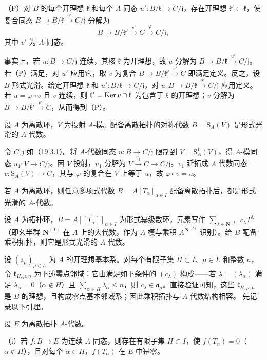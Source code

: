 \noindent（P）对 $B$ 的每个开理想 $\mathfrak k$ 和每个 $A$-同态 $u':B/\mathfrak k\to C/\mathfrak j$，存在开理想 $\mathfrak k'\subset\mathfrak k$，使复合同态 $B\to B/\mathfrak k\xrightarrow{u'}C/\mathfrak j$ 分解为
\[
 B\to B/\mathfrak k'\xrightarrow{v'}C\xrightarrow{\varphi}C/\mathfrak j,
\]
其中 $v'$ 为 $A$-同态。

事实上，若 $u:B\to C/\mathfrak j$ 连续，其核 $\mathfrak k$ 为开理想，故 $u$ 分解为 $B\to B/\mathfrak k\xrightarrow{u'}C/\mathfrak j$。若（P）满足，对 $u'$ 应用它，取 $v$ 为复合 $B\to B/\mathfrak k'\xrightarrow{v'}C$ 即满足定义。反之，设 $B$ 形式光滑。给定开理想 $\mathfrak k$ 和 $u':B/\mathfrak k\to C/\mathfrak j$，对 $u:B\to B/\mathfrak k\xrightarrow{u'}C/\mathfrak j$ 应用定义。若 $u=\varphi\circ v$ 且 $v$ 连续，则 $\mathfrak k'=\operatorname{Ker} v\cap\mathfrak k$ 为包含于 $\mathfrak k$ 的开理想；$v$ 分解为 $B\to B/\mathfrak k'\xrightarrow{v'}C$，从而得到（P）。

设 $A$ 为离散环，$V$ 为投射 $A$-模。配备离散拓扑的对称代数 $B=\mathrm S_A(V)$ 是形式光滑的 $A$-代数。

令 $C,\mathfrak j$ 如（19.3.1）。将 $A$-代数同态 $u:B\to C/\mathfrak j$ 限制到 $V=\mathrm S_A^1(V)$，得 $A$-模同态 $u_1:V\to C/\mathfrak j$。因 $V$ 投射，$u_1$ 分解为 $V\xrightarrow{v_1}C\to C/\mathfrak j$。$v_1$ 延拓成 $A$-代数同态 $v:\mathrm S_A(V)\to C$，其与 $\varphi$ 的复合在 $V$ 上等于 $u$，故 $\varphi\circ v=u$。

若 $A$ 为离散环，则任意多项式代数 $B=A[T_\alpha]_{\alpha\in I}$ 配备离散拓扑后，都是形式光滑的 $A$-代数。

设 $A$ 为拓扑环，$B=A[[T_\alpha]]_{\alpha\in I}$ 为形式幂级数环，元素写作 $\sum_{\lambda\in\mathbf N^{(I)}}c_\lambda T^\lambda$（即幺半群 $\mathbf N^{(I)}$ 在 $A$ 上的大代数，作为 $A$-模与乘积 $A^{\mathbf N^{(I)}}$ 识别）。给 $B$ 配备乘积拓扑，则它是形式光滑的 $A$-代数。

设 $(\mathfrak a_\mu)_{\mu\in L}$ 为 $A$ 的开理想基本系。对每个有限子集 $H\subset I$、$\mu\in L$ 和整数 $n$，令 $\mathfrak k_{H,\mu,n}$ 为下述零点邻域：它由满足如下条件的 $(c_\lambda)$ 构成——若 $\lambda=(\lambda_\alpha)$ 满足 $\lambda_\alpha=0$（$\alpha\notin H$）且 $\sum_{\alpha\in H}\lambda_\alpha\leq n$，则 $c_\lambda\in\mathfrak a_\mu$。直接验证可知，这些 $\mathfrak k_{H,\mu,n}$ 是 $B$ 的理想，且构成零点基本邻域系；因此乘积拓扑与 $A$-代数结构相容。
先记录以下引理。

设 $E$ 为离散拓扑 $A$-代数。

（i）若 $f:B\to E$ 为连续 $A$-同态，则存在有限子集 $H\subset I$，使 $f(T_\alpha)=0$（$\alpha\notin H$），且对每个 $\alpha\in H$，$f(T_\alpha)$ 在 $E$ 中幂零。

